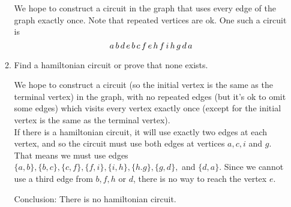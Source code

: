 \documentclass[11pt]{amsart}
\begin{document}
\begin{enumerate}
\begin{enumerate}
 {\color{blue}
 We hope to construct a circuit in the graph that uses every edge of the graph exactly once. Note that repeated vertices are ok. One such a circuit is
 \[ 
 a\, b\, d\, e\, b\, c\, f\, e\, h\, f\, i\, h\, g\, d\, a\\[3pt]
 \] 
 }
  
  \item  Find a hamiltonian circuit or prove that none exists.\\[3pt]
{\color{blue}
We hope to construct a circuit (so the initial vertex  is the same as the terminal vertex) in the graph, with no repeated edges (but it's ok to omit some edges) which visits every vertex exactly once (except for  the initial vertex is the same as the terminal vertex).\\[2pt]
If there is a hamiltonian circuit, it will use exactly two edges at each vertex, and so the circuit must use both edges at vertices $a, c, i$ and $g$. That means we must use edges $\{a,b\}, \{b,c\}, \{c,f\}, \{f,i\},
\{i,h\}, \{h.g\}, \{g,d\},$ and $\{d,a\}$. Since we cannot use a third
edge from $b,f,h$ or $d$, there is no way to reach the vertex $e$.

Conclusion: There is no hamiltonian circuit.\\[5pt]
}
  
\end{enumerate}
 
 
\\[5pt]
  

\end{enumerate}
\end{document}
